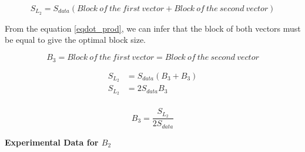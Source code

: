 \[S_{L_2} = S_{data}(Block\ of\ the\ first\ vector + Block\ of\ the\ second\ vector)\]

From the equation \ref{eqdot_prod}, we can infer that the block of both vectors must
be equal to give the optimal block size.

\[B_3 = Block\ of\ the\ first\ vector = Block\ of\ the\ second\ vector\]

\begin{align*}
    S_{L_2} &= S_{data}(B_3 + B_3)\\
    S_{L_2} &= 2S_{data}B_3\\
\end{align*}

\begin{equation}
    B_3 = \frac{S_{L_2}}{2S_{data}}
    \label{eq:dot_block3}
\end{equation}

\newpage
\textbf{Experimental Data for $B_2$}

\begin{figure}[htb]
    \centering
    \label{fig:dot_Stuning_block3}
    \qquad
    \label{fig:dot_Dtuning_block3}
\end{figure}

